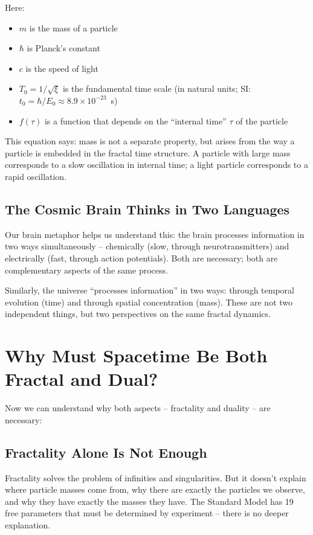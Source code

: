 Here:
\begin{itemize}[leftmargin=*]
\item $m$ is the mass of a particle
\item $\hbar$ is Planck's constant
\item $c$ is the speed of light
\item $T_0 = 1/\sqrt{\xi}$ is the fundamental time scale (in natural units; SI: $t_0 = \hbar/E_0 \approx 8.9 \times 10^{-23}$~s)
\item $f(\tau)$ is a function that depends on the ``internal time'' $\tau$ of the particle
\end{itemize}

This equation says: mass is not a separate property, but arises from the way a particle is embedded in the fractal time structure. A particle with large mass corresponds to a slow oscillation in internal time; a light particle corresponds to a rapid oscillation.

\subsection{The Cosmic Brain Thinks in Two Languages}

Our brain metaphor helps us understand this: the brain processes information in two ways simultaneously -- chemically (slow, through neurotransmitters) and electrically (fast, through action potentials). Both are necessary; both are complementary aspects of the same process.

Similarly, the universe ``processes information'' in two ways: through temporal evolution (time) and through spatial concentration (mass). These are not two independent things, but two perspectives on the same fractal dynamics.

\section{Why Must Spacetime Be Both Fractal and Dual?}

Now we can understand why both aspects -- fractality and duality -- are necessary:

\subsection{Fractality Alone Is Not Enough}

Fractality solves the problem of infinities and singularities. But it doesn't explain where particle masses come from, why there are exactly the particles we observe, and why they have exactly the masses they have. The Standard Model has 19 free parameters that must be determined by experiment -- there is no deeper explanation.

